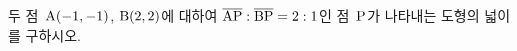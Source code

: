 두 점~$\mathrm{A}(-1{,}\mkern3mu\mathopen{}-1)$, $\mathrm{B}(2{,}\mkern3mu\mathopen{}2)$에 대하여 $\overline{\mathrm{AP}}:\overline{\mathrm{BP}}=2:1$인 점~$\mathrm{P}$가 나타내는 도형의 넓이를 구하시오.
